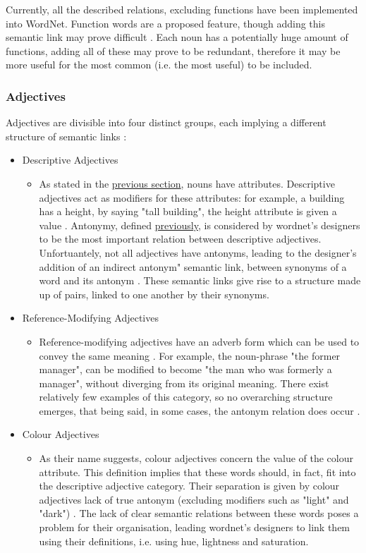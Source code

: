 \documentclass[]{article}
\begin{document}
Currently, all the described relations, excluding functions have been implemented into WordNet. Function words are a proposed feature, though adding this semantic link may prove difficult \cite{WN2Nouns}. Each noun has a potentially huge amount of functions, adding all of these may prove to be redundant, therefore it may be more useful for the most common (i.e. the most useful) to be included.

\subsubsection{Adjectives}
\label{Adjectives}
Adjectives are divisible into four distinct groups, each implying a different structure of semantic links \cite{WN3Adjectives}:
\begin{itemize}
	\item Descriptive Adjectives
	\begin{itemize}
		\item As stated in the \hyperref[Nouns]{previous section}, nouns have attributes. Descriptive adjectives act as modifiers for these attributes: for example, a building has a height, by saying "tall building", the height attribute is given a value \cite{WN3Adjectives}. Antonymy, defined \hyperref[Antonym]{previously}, is considered by wordnet's designers to be the most important relation between descriptive adjectives. Unfortuantely, not all adjectives have antonyms, leading to the designer's addition of an indirect antonym" semantic link, between synonyms of a word and its antonym \cite{WN3Adjectives}. These semantic links give rise to a structure made up of pairs, linked to one another by their synonyms.
	\end{itemize}		
		
	\item Reference-Modifying Adjectives
	\begin{itemize}
		\item Reference-modifying adjectives have an adverb form which can be used to convey the same meaning \cite{WN3Adjectives}. For example, the noun-phrase "the former manager", can be modified to become "the man who was formerly a manager", without diverging from its original meaning. There exist relatively few examples of this category, so no overarching structure emerges, that being said, in some cases, the antonym relation does occur \cite{WN3Adjectives}.
	\end{itemize}
	
	\item Colour Adjectives
	\begin{itemize}
		\item As their name suggests, colour adjectives concern the value of the colour attribute. This definition implies that these words should, in fact, fit into the descriptive adjective category. Their separation is given by colour adjectives lack of true antonym (excluding modifiers such as "light" and "dark") \cite{WN3Adjectives}. The lack of clear semantic relations between these words poses a problem for their organisation, leading wordnet's designers to link them using their definitions, i.e. using hue, lightness and saturation.
	\end{itemize}	
	

\end{itemize}
\end{document}
